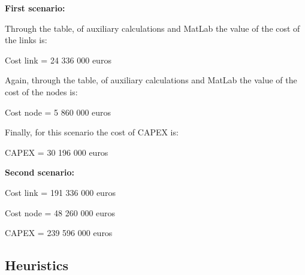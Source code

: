 \textbf{First scenario:}

Through the table, of auxiliary calculations and MatLab the value of the cost of the links is:

Cost link = 24 336 000 euros

Again, through the table, of auxiliary calculations and MatLab the value of the cost of the nodes is:

Cost node = 5 860 000 euros

Finally, for this scenario the cost of CAPEX is:

CAPEX = 30 196 000 euros

\textbf{Second scenario:}

Cost link = 191 336 000 euros

Cost node = 48 260 000 euros

CAPEX = 239 596 000 euros


\subsection{Heuristics}

